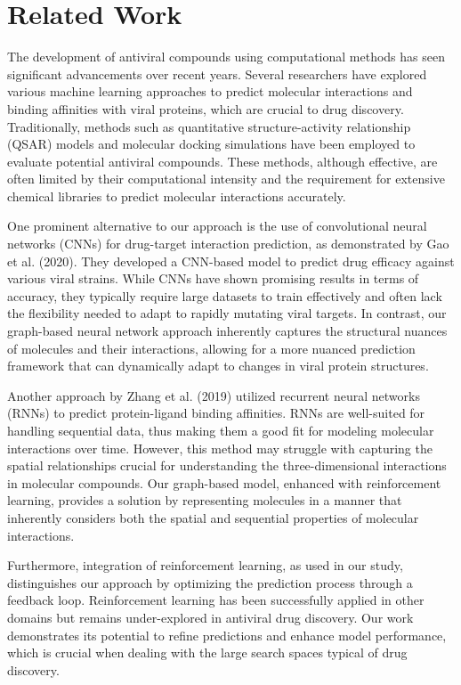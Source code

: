 \documentclass{article}
\begin{document}
\section{Related Work}
The development of antiviral compounds using computational methods has seen significant advancements over recent years. Several researchers have explored various machine learning approaches to predict molecular interactions and binding affinities with viral proteins, which are crucial to drug discovery. Traditionally, methods such as quantitative structure-activity relationship (QSAR) models and molecular docking simulations have been employed to evaluate potential antiviral compounds. These methods, although effective, are often limited by their computational intensity and the requirement for extensive chemical libraries to predict molecular interactions accurately.

One prominent alternative to our approach is the use of convolutional neural networks (CNNs) for drug-target interaction prediction, as demonstrated by Gao et al. (2020). They developed a CNN-based model to predict drug efficacy against various viral strains. While CNNs have shown promising results in terms of accuracy, they typically require large datasets to train effectively and often lack the flexibility needed to adapt to rapidly mutating viral targets. In contrast, our graph-based neural network approach inherently captures the structural nuances of molecules and their interactions, allowing for a more nuanced prediction framework that can dynamically adapt to changes in viral protein structures.

Another approach by Zhang et al. (2019) utilized recurrent neural networks (RNNs) to predict protein-ligand binding affinities. RNNs are well-suited for handling sequential data, thus making them a good fit for modeling molecular interactions over time. However, this method may struggle with capturing the spatial relationships crucial for understanding the three-dimensional interactions in molecular compounds. Our graph-based model, enhanced with reinforcement learning, provides a solution by representing molecules in a manner that inherently considers both the spatial and sequential properties of molecular interactions.

Furthermore, integration of reinforcement learning, as used in our study, distinguishes our approach by optimizing the prediction process through a feedback loop. Reinforcement learning has been successfully applied in other domains but remains under-explored in antiviral drug discovery. Our work demonstrates its potential to refine predictions and enhance model performance, which is crucial when dealing with the large search spaces typical of drug discovery.
\end{document}

